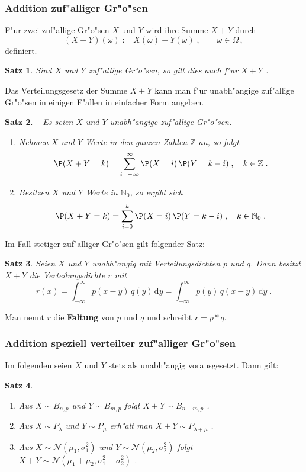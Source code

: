 \documentclass[ngerman,draft,parskip=half,twoside]{scrartcl}
\newtheorem{thm}{Satz}[section]
\newcommand*{\N}{\mathbb{N}}      %
\newcommand*{\Z}{\mathbb{Z}}      %
\begin{document}
\subsubsection{Addition zuf"alliger Gr"o"sen}
F"ur zwei zuf"allige Gr"o"sen $X$  und $Y$ wird ihre Summe $X+Y$ durch
$$
(X+Y)(\omega):=X(\omega)+Y(\omega)\;,\qquad \omega\in\Omega\,,
$$
definiert.
\begin{thm}
Sind $X$ und $Y$ zuf"allige Gr"o"sen, so gilt dies auch f"ur $X+Y$ .
\end{thm}
Das Verteilungsgesetz der Summe $X+Y$ kann man f"ur unabh"angige zuf"allige Gr"o"sen in einigen
F"allen in einfacher Form angeben.
\begin{thm}~
Es seien $X$ und $Y$ unabh"angige zuf"allige Gr"o"sen.
\begin{enumerate}
\item
Nehmen $X$ und $Y$ Werte in den ganzen Zahlen $\Z$ an, so folgt
$$
\P(X+Y=k)=\sum_{i=-\infty}^\infty\P(X=i)\,\P(Y=k-i)\;,\quad k\in \Z\;.
$$
\item
Besitzen $X$ und $Y$ Werte in $\N_0$, so ergibt sich
$$
\P(X+Y=k)=\sum_{i=0}^k\P(X=i)\,\P(Y=k-i)\;,\quad k\in \N_0\;.
$$
\end{enumerate}
\end{thm}
Im Fall stetiger zuf"alliger Gr"o"sen gilt folgender Satz$\colon$
\begin{thm}
Seien $X$ und $Y$ unabh"angig mit Verteilungsdichten $p$ und $q$. Dann besitzt $X+Y$
die Verteilungsdichte $r$  mit
$$
r(x)=\int_{-\infty}^\infty p(x-y)\,q(y)\,\mathrm d y = \int_{-\infty}^\infty p(y)\,q(x-y)\,\mathrm d y \;.
$$
\end{thm}
Man nennt $r$ die \textbf{Faltung} von $p$ und $q$ und schreibt $r=p*q$.
\subsubsection{Addition speziell verteilter zuf"alliger Gr"o"sen}
Im folgenden seien $X$ und $Y$ stets als unabh"angig vorausgesetzt. Dann gilt$\colon$
\begin{thm}~
\begin{enumerate}
\item[\rm (a)]
Aus $X\sim B_{n,p}$ und $Y\sim B_{m,p}$ folgt $X+Y\sim B_{n+m,p}$  .
\item[\rm (b)]
Aus $X\sim P_\lambda$ und $Y\sim P_\mu$ erh"alt man $X+Y\sim P_{\lambda+\mu}$ .
\item[\rm (c)]
Aus $X\sim\mathcal N(\mu_1,\sigma_1^2)$ und $Y\sim\mathcal N(\mu_2,\sigma_2^2)$ folgt
$X+Y\sim \mathcal N(\mu_1+\mu_2,\sigma_1^2+\sigma_2^2)$ .
\end{enumerate}
\end{thm}
\end{document}
